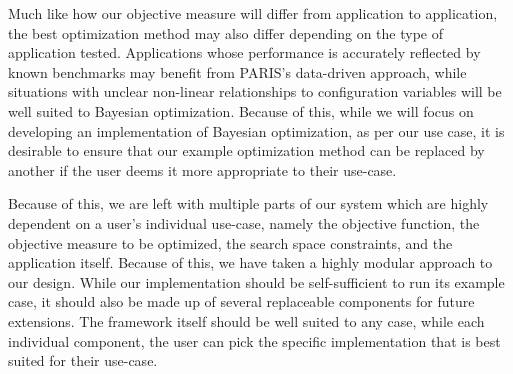 \documentclass{report}
\begin{document}
Much like how our objective measure will differ from application to application, the best optimization method may also differ depending on the type of application tested. Applications whose performance is accurately reflected by known benchmarks may benefit from PARIS's data-driven approach, while situations with unclear non-linear relationships to configuration variables will be well suited to Bayesian optimization. Because of this, while we will focus on developing an implementation of Bayesian optimization, as per our use case, it is desirable to ensure that our example optimization method can be replaced by another if the user deems it more appropriate to their use-case.

Because of this, we are left with multiple parts of our system which are highly dependent on a user's individual use-case, namely the objective function, the objective measure to be optimized, the search space constraints, and the application itself. Because of this, we have taken a highly modular approach to our design. While our implementation should be self-sufficient to run its example case, it should also be made up of several replaceable components for future extensions. The framework itself should be well suited to any case, while each individual component, the user can pick the specific implementation that is best suited for their use-case.
 
\end{document}
